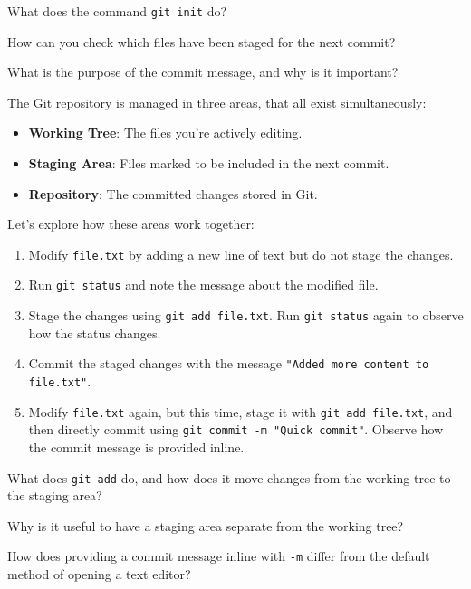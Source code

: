 \begin{challenge}
\begin{task}
        \begin{questions}
            \item What does the command \texttt{git init} do?
            \item How can you check which files have been staged for the next commit?
            \item What is the purpose of the commit message, and why is it important?
        \end{questions}
    \end{task}

    \begin{task}
        The Git repository is managed in three areas, that all exist simultaneously:
        \begin{itemize}
            \item \textbf{Working Tree}: The files you're actively editing.
            \item \textbf{Staging Area}: Files marked to be included in the next commit.
            \item \textbf{Repository}: The committed changes stored in Git.
        \end{itemize}
        Let's explore how these areas work together:
        \begin{enumerate}
            \item Modify \texttt{file.txt} by adding a new line of text but do not stage the changes.
            \item Run \texttt{git status} and note the message about the modified file.
            \item Stage the changes using \texttt{git add file.txt}. Run \texttt{git status} again to observe how the status changes.
            \item Commit the staged changes with the message \texttt{"Added more content to file.txt"}.
            \item Modify \texttt{file.txt} again, but this time, stage it with \texttt{git add file.txt}, and then directly commit using \texttt{git commit -m "Quick commit"}. Observe how the commit message is provided inline.
        \end{enumerate}

        \begin{questions}
            \item What does \texttt{git add} do, and how does it move changes from the working tree to the staging area?
            \item Why is it useful to have a staging area separate from the working tree?
            \item How does providing a commit message inline with \texttt{-m} differ from the default method of opening a text editor?
        \end{questions}
    \end{task}


\end{challenge}
